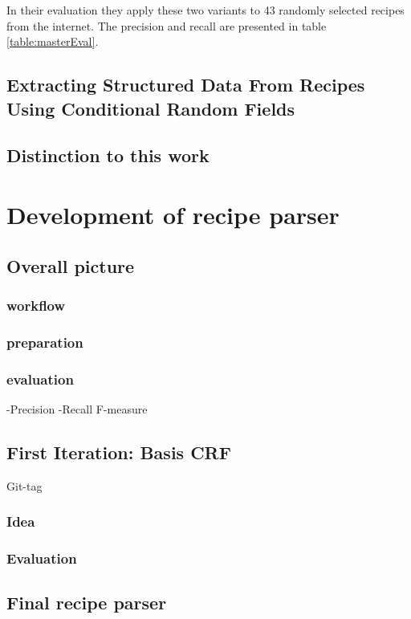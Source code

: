 \documentclass[12pt, twoside]{report}
\begin{document}
In their evaluation they apply these two variants to 43 randomly selected recipes from the internet. The precision and recall are presented in table \cref{table:masterEval}.

\section{Extracting Structured Data From Recipes Using Conditional Random Fields}\label{sec:crfzeit}
\parencite{CRFZeit}


\section{Distinction to this work}



\chapter{Development of recipe parser}

\section{Overall picture}
\subsection{workflow}
\subsection{preparation}
\subsection{evaluation}
-Precision -Recall F-measure

\section{First Iteration: Basis CRF}
Git-tag
\subsection{Idea}
\subsection{Evaluation}

\section{Final recipe parser}
\end{document}
